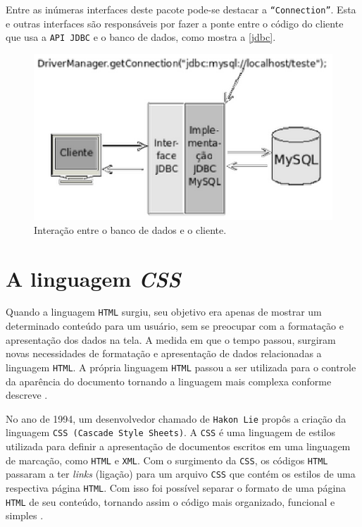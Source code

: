  Entre as inúmeras interfaces deste pacote pode-se destacar a \texttt{“Connection”}. Esta e outras interfaces são responsáveis por fazer a ponte entre 
 o código do cliente que usa a \texttt{API JDBC} e o banco de dados, como mostra a \autoref{jdbc}.
 
 \begin{figure}[h]
	\centering
	\caption{\label{jdbc}Interação entre o banco de dados e o cliente.}
		\includegraphics[keepaspectratio=true,scale=1]{figuras/jdbc.eps}
\end{figure}
 
 \section{A linguagem \textit{CSS}}
 
 Quando a linguagem \texttt{HTML} surgiu, seu objetivo era apenas de mostrar um determinado conteúdo para um usuário, sem se preocupar com a formatação
 e apresentação dos dados na tela. A medida em que o tempo passou, surgiram novas necessidades de formatação e apresentação de dados relacionadas
 a linguagem \texttt{HTML}. A própria linguagem \texttt{HTML} passou a ser utilizada para o controle da aparência do documento tornando a linguagem mais complexa 
 conforme descreve \cite{isabelecss}.
 
 No ano de 1994, um desenvolvedor chamado de \texttt{Hakon Lie} propôs a criação da linguagem \texttt{CSS (Cascade Style Sheets)}. A \texttt{CSS} é uma linguagem de 
 estilos utilizada para definir a apresentação de documentos escritos em uma linguagem de marcação, como \texttt{HTML} e \texttt{XML}. Com o surgimento da 
 \texttt{CSS}, os códigos \texttt{HTML} passaram a ter \textit{links} (ligação) para um arquivo \texttt{CSS} que contém os estilos de uma respectiva página \texttt{HTML}. Com isso 
 foi possível separar o formato de uma página \texttt{HTML} de seu conteúdo, tornando assim o código mais organizado, funcional e simples \cite{isabelecss}.
 

